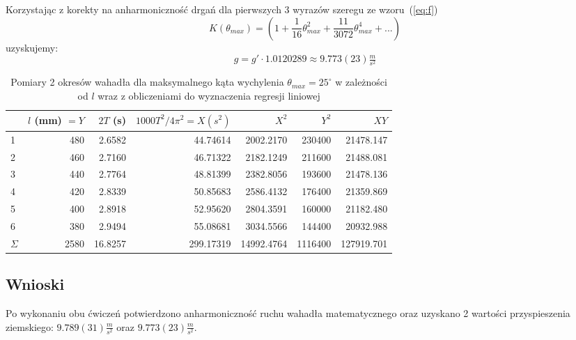 \documentclass[a4paper]{article}
\begin{document}
Korzystając z korekty na anharmoniczność drgań dla pierwszych 3 wyrazów szeregu ze wzoru~(\ref{eq:f})
\[ K(\theta_{max}) = \left( 1 + \frac{1}{16}\theta^2_{max} + \frac{11}{3072}\theta^4_{max} + ... \right) \]
uzyskujemy: \[ g = g' \cdot 1.0120289 \approx 9.773(23) \tfrac{m}{s^2}\]



\begin{table}[h]
\centering

	\begin{tabular}{lrrrrrr}
	\toprule
		{} & $l$ (mm) $=Y$ &  $2T$ (s) & \small$1000T^2/4\pi^2$\normalsize$=X (s^2)$ & $X^2$ & $Y^2$ & $XY$ \\
	\midrule
	1 &     480 &  2.6582 &  44.74614 &  2002.2170 &  230400 &  21478.147 \\
	2 &     460 &  2.7160 &  46.71322 &  2182.1249 &  211600 &  21488.081 \\
	3 &     440 &  2.7764 &  48.81399 &  2382.8056 &  193600 &  21478.136 \\
	4 &     420 &  2.8339 &  50.85683 &  2586.4132 &  176400 &  21359.869 \\
	5 &     400 &  2.8918 &  52.95620 &  2804.3591 &  160000 &  21182.480 \\
	6 &     380 &  2.9494 &  55.08681 &  3034.5566 &  144400 &  20932.988 \\
	\midrule
	$\Sigma$ & 2580 & 16.8257 & 299.17319& 14992.4764 & 1116400 & 127919.701 \\
	\bottomrule
	\end{tabular}
	
\caption{Pomiary 2 okresów wahadła dla maksymalnego kąta wychylenia $\theta_{max} = 25^\circ$ w  zależności od $l$ wraz z obliczeniami do wyznaczenia regresji liniowej}
\label{pomiary_3}
\end{table}



\subsection{Wnioski}
Po wykonaniu obu ćwiczeń potwierdzono anharmoniczność ruchu wahadła matematycznego oraz uzyskano
2 wartości przyspieszenia ziemskiego: $9.789(31) \tfrac{m}{s^2}$ oraz $9.773(23) \tfrac{m}{s^2}$.
\end{document}
